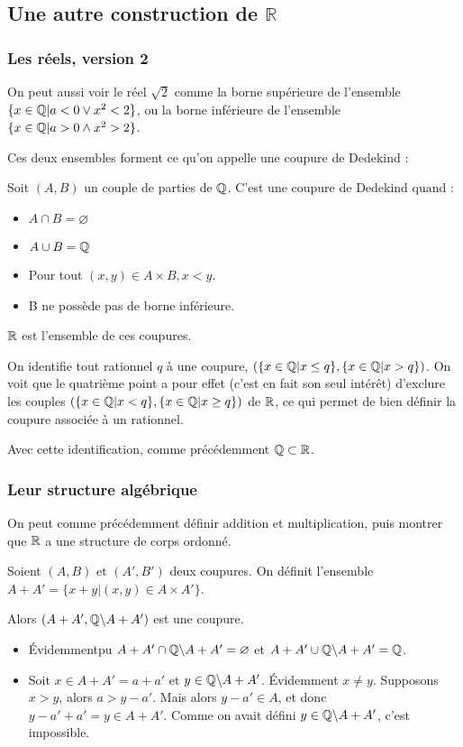 \subsection{Une autre construction de \texorpdfstring{$\mathbb{R}$}{R}}
\subsubsection{Les réels, version 2}

On peut aussi voir le réel $\sqrt{2}$ comme la borne supérieure de l'ensemble $\{x\in \mathbb{Q} | a<0 \lor x^2<2\}$, ou la borne inférieure de l'ensemble $\{x\in \mathbb{Q} | a>0 \land x^2>2\}$.

Ces deux ensembles forment ce qu'on appelle une coupure de Dedekind :
\begin{defini}
    Soit $(A, B)$ un couple de parties de $\mathbb{Q}$. C'est une coupure de Dedekind quand :
    \begin{itemize}
        \item $A\cap B = \varnothing$
        \item $A\cup B = \mathbb{Q}$
        \item Pour tout $(x,y) \in A\times B, x<y$.
        \item B ne possède pas de borne inférieure. 
    \end{itemize}
\end{defini}

$\mathbb{R}$ est l'ensemble de ces coupures.

On identifie tout rationnel $q$ à une coupure, $(\{x\in \mathbb{Q} | x \leq q\}, \{x\in \mathbb{Q} | x > q\})$. On voit que le quatrième point a pour effet (c'est en fait son seul intérêt) d'exclure les couples $(\{x\in \mathbb{Q} | x < q\}, \{x\in \mathbb{Q} | x  \geq q\})$ de $\mathbb{R}$, ce qui permet de bien définir la coupure associée à un rationnel.

Avec cette identification, comme précédemment $\mathbb{Q} \subset \mathbb{R}$.

\subsubsection{Leur structure algébrique}

On peut comme précédemment définir addition et multiplication, puis montrer que $\mathbb{R}$ a une structure de corps ordonné.

\begin{defini}[Addition]
    Soient $(A, B)$ et $(A', B')$ deux coupures. On définit l'ensemble $A+A'=\{x+y | (x,y) \in A \times A'\}$.
    
    Alors $(A+A', \mathbb{Q}\backslash A+A')$ est une coupure.
    \tcblower
    \begin{itemize}
        \item Évidemmentpu $A+A'\cap \mathbb{Q}\backslash A+A'=\varnothing$ et $A+A'\cup \mathbb{Q}\backslash A+A'=\mathbb{Q}$.
        \item Soit $x\in A+A'=a+a'$ et $y\in\mathbb{Q}\backslash A+A'$. Évidemment $x\neq y$. Supposons $x>y$, alors $a>y-a'$. Mais alors $y-a' \in A$, et donc $y-a'+a'=y\in A+A'$. Comme on avait défini $y\in\mathbb{Q}\backslash A+A'$, c'est impossible.
    \end{itemize}
\end{defini}

